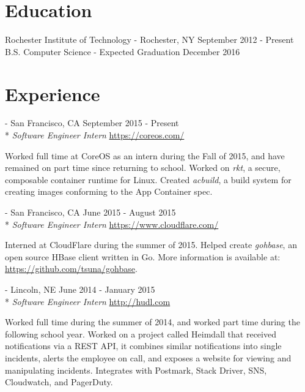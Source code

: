 \documentclass[letterpaper,margin,line,11pt]{resume}
\newcommand{\rurl}[1]{\hfill {\footnotesize \url{#1}}}
\newcommand{\rdate}[1]{\hfill {\small #1}}
\renewcommand{\employer}[5]{\item[#1] - #2 \rdate{#3} \\* #4 \rurl{#5}}
\begin{document}
\begin{resume}
\section{\mysidestyle Education}
    \begin{compactdesc}
        \item[Rochester Institute of Technology] - Rochester, NY \rdate{September 2012 - Present}
        \small
        \\B.S. Computer Science  - Expected Graduation December 2016
    \end{compactdesc}

\section{\mysidestyle Experience}
    \begin{asparadesc}
        \employer{CoreOS}{San Francisco, CA} {September 2015 - Present}{\textit{Software Engineer Intern}}{https://coreos.com/}

        \small
        Worked full time at CoreOS as an intern during the Fall of 2015, and have remained on part time since returning to school. Worked on \textit{rkt}, a secure, composable container runtime for Linux. Created \textit{acbuild}, a build system for creating images conforming to the App Container spec.
        \normalsize
        \\

        \employer{CloudFlare}{San Francisco, CA} {June 2015 - August 2015}{\textit{Software Engineer Intern}}{https://www.cloudflare.com/}

        \small
        Interned at CloudFlare during the summer of 2015. Helped create \textit{gohbase}, an open source HBase client written in Go. More information is available at: \url{https://github.com/tsuna/gohbase}.
        \normalsize
        \\

        \employer{Hudl}{Lincoln, NE}{June 2014 - January 2015}{\textit{Software Engineer Intern}}{http://hudl.com}

        \small
        Worked full time during the summer of 2014, and worked part time during the following school year. Worked on a project called Heimdall that received notifications via a REST API, it combines similar notifications into single incidents, alerts the employee on call, and exposes a website for viewing and manipulating incidents. Integrates with Postmark, Stack Driver, SNS, Cloudwatch, and PagerDuty.
        \normalsize
    \end{asparadesc}


\end{resume}
\end{document}

